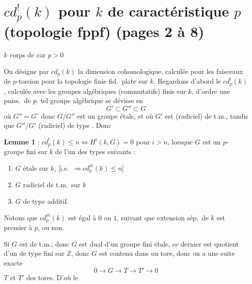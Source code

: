 \documentclass[11pt,a4paper]{article}
\begin{document}
\section*{$cd_p^{!}(k)$ pour $k$ de caractéristique $p$ (topologie fppf) (pages 2 à 8)}


$k$ corps de car $p > 0$

On désigne par $cd_p(k)$ la dimension cohomologique, calculée pour les
faisceaux de $p$-torsion pour la topologie finie  fid.\ plate
sur $k$. Regardons d'abord le $cd_p^{!}(k)$, calculée avec les groupes
algébriques (commutatifs) finis sur $k$, d'ordre une puiss.\ de $p$.
 tel groupe algébrique se dévisse en
\[
G' \subset G'' \subset G
\]
où $G'' = G^{\circ}$ donc $G/G''$ est un groupe étale, et où $G'$ est
(radiciel) de t.m., tandis que $G''/G'$ (radiciel)  de type
. Donc

\textbf{Lemme 1} : $cd_p^{!}(k) \leqslant n \Longleftrightarrow H^i(k,G) = 0$
pour $i > n$, lorsque $G$ est un $p$-groupe fini sur $k$ de l'un des types
suivants :
\begin{enumerate}
\item[a)] $G$ étale sur $k$, [i.e.\ $\Longrightarrow cd_p^{\text{ét}}(k) \leqslant n$]
\item[b)] $G$ radiciel de t.m.\ sur $k$
\item[c)] $G$  de type additif.
\end{enumerate}

Notons que $cd_p^{\text{ét}}(k)$ est égal à $0$ ou $1$, suivant que
 extension  sép.\ de $k$ est
 premier à $p$, ou non.

Si $G$ est de t.m., donc $G$ est dual d'un groupe fini étale, ce dernier
est quotient d'un   de type fini
sur $\mathbb{Z}$, donc $G$ est contenu dans un tore, donc on a une suite
exacte
\[
0 \longrightarrow G \longrightarrow T \longrightarrow T' \longrightarrow 0
\]
$T$ et $T'$ des tores. D'où le
\end{document}
